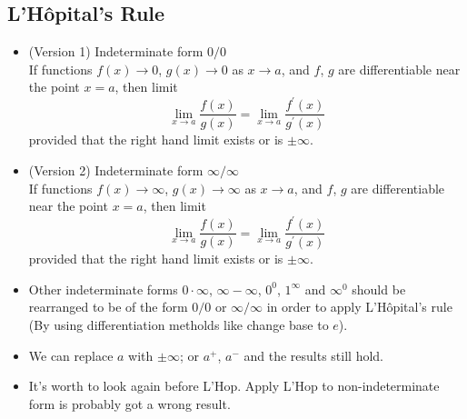 \subsection{L'H\^opital's Rule}
\begin{itemize}
\item (Version 1) Indeterminate form $0/0$\\
  If functions $f(x)\to0$, $g(x)\to0$ as $x\to a$, and $f$, $g$ are differentiable near the point $x=a$, then limit
  \[\lim_{x\to a}\frac{f(x)}{g(x)}=\lim_{x\to a}\frac{f^\prime(x)}{g^\prime(x)}\]
  provided that the right hand limit exists or is $\pm\infty$.
\item (Version 2) Indeterminate form $\infty/\infty$\\
  If functions $f(x)\to\infty$, $g(x)\to\infty$ as $x\to a$, and $f$, $g$ are differentiable near the point $x=a$, then limit
  \[\lim_{x\to a}\frac{f(x)}{g(x)}=\lim_{x\to a}\frac{f^\prime(x)}{g^\prime(x)}\]
  provided that the right hand limit exists or is $\pm\infty$.
\item Other indeterminate forms $0\cdot\infty$, $\infty-\infty$, $0^0$, $1^\infty$ and $\infty^0$ should be rearranged to be of the form $0/0$ or $\infty/\infty$ in order to apply L'H\^opital's rule (By using differentiation metholds like change base to $e$).
\end{itemize}
\begin{note}
  \begin{itemize}\leavevmode
  \item We can replace $a$ with $\pm\infty$; or $a^+$, $a^-$ and the results still hold.
  \item It's worth to look again before L'Hop. Apply L'Hop to non-indeterminate form is probably got a wrong result.
  \end{itemize}
\end{note}
